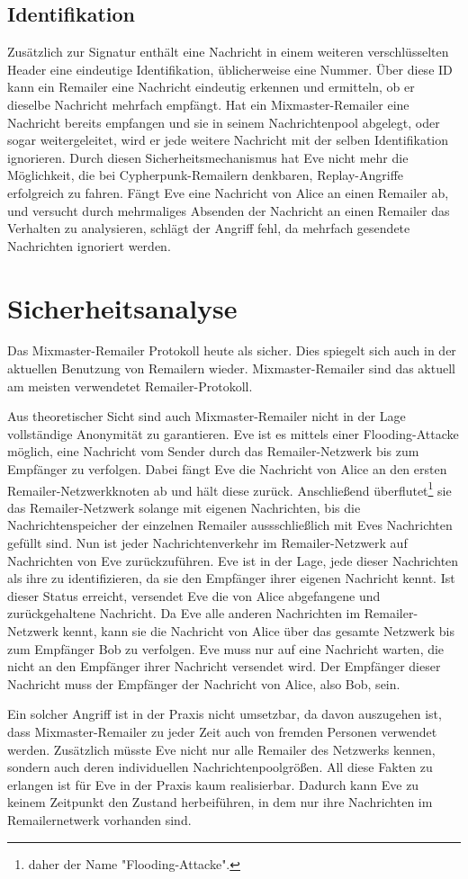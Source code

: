 \subsection{Identifikation}
Zusätzlich zur Signatur enthält eine Nachricht in einem weiteren verschlüsselten Header eine eindeutige Identifikation, üblicherweise eine Nummer. Über diese ID kann ein Remailer eine Nachricht eindeutig erkennen und ermitteln, ob er dieselbe Nachricht mehrfach empfängt. Hat ein Mixmaster-Remailer eine Nachricht bereits empfangen und sie in seinem Nachrichtenpool abgelegt, oder sogar weitergeleitet, wird er jede weitere Nachricht mit der selben Identifikation ignorieren. Durch diesen Sicherheitsmechanismus hat Eve nicht mehr die Möglichkeit, die bei Cypherpunk-Remailern denkbaren, Replay-Angriffe erfolgreich zu fahren. Fängt Eve eine Nachricht von Alice an einen Remailer ab, und versucht durch mehrmaliges Absenden der Nachricht an einen Remailer das Verhalten zu analysieren, schlägt der Angriff fehl, da mehrfach gesendete Nachrichten ignoriert werden.

\section{Sicherheitsanalyse}
Das Mixmaster-Remailer Protokoll heute als sicher. Dies spiegelt sich auch in der aktuellen Benutzung von Remailern wieder. Mixmaster-Remailer sind das aktuell am meisten verwendetet Remailer-Protokoll.

Aus theoretischer Sicht sind auch Mixmaster-Remailer nicht in der Lage vollständige Anonymität zu garantieren. Eve ist es mittels einer Flooding-Attacke möglich, eine Nachricht vom Sender durch das Remailer-Netzwerk bis zum Empfänger zu verfolgen. Dabei fängt Eve die Nachricht von Alice an den ersten Remailer-Netzwerkknoten ab und hält diese zurück. Anschließend überflutet\footnote{daher der Name "Flooding-Attacke".} sie das Remailer-Netzwerk solange mit eigenen Nachrichten, bis die Nachrichtenspeicher der einzelnen Remailer aussschließlich mit Eves Nachrichten gefüllt sind. Nun ist jeder Nachrichtenverkehr im Remailer-Netzwerk auf Nachrichten von Eve zurückzuführen. Eve ist in der Lage, jede dieser Nachrichten als ihre zu identifizieren, da sie den Empfänger ihrer eigenen Nachricht kennt. Ist dieser Status erreicht, versendet Eve die von Alice abgefangene und zurückgehaltene Nachricht. Da Eve alle anderen Nachrichten im Remailer-Netzwerk kennt, kann sie die Nachricht von Alice über das gesamte Netzwerk bis zum Empfänger Bob zu verfolgen. Eve muss nur auf eine Nachricht warten, die nicht an den Empfänger ihrer Nachricht versendet wird. Der Empfänger dieser Nachricht muss der Empfänger der Nachricht von Alice, also Bob, sein.

Ein solcher Angriff ist in der Praxis nicht umsetzbar, da davon auszugehen ist, dass Mixmaster-Remailer zu jeder Zeit auch von fremden Personen verwendet werden. Zusätzlich müsste Eve nicht nur alle Remailer des Netzwerks kennen, sondern auch deren individuellen Nachrichtenpoolgrößen. All diese Fakten zu erlangen ist für Eve in der Praxis kaum realisierbar. Dadurch kann Eve zu keinem Zeitpunkt den Zustand herbeiführen, in dem nur ihre Nachrichten im Remailernetwerk vorhanden sind.